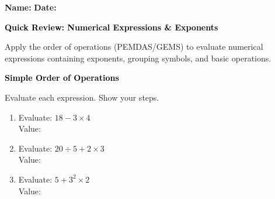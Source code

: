\documentclass[12pt, letterpaper, fleqn]{article}
\newcommand{\blanklong}{\underline{\hspace{6.5cm}}}
\begin{document}
\textbf{Name:} \underline{\hspace{5cm}}
\hfill
\textbf{Date:} \underline{\hspace{3cm}}\\

\begin{tcolorbox}[colback=black!10]
    \large\textcolor{black}{\textbf{Quick Review: Numerical Expressions \& Exponents}}
\end{tcolorbox}

\vspace{3mm}
\noindent
Apply the order of operations (PEMDAS/GEMS) to evaluate numerical expressions containing exponents, grouping symbols, and basic operations.

\vspace{4mm}

\begin{tcolorbox}[colback=black!10]
\large\textcolor{black}{\textbf{Simple Order of Operations}}
\end{tcolorbox}

\noindent
Evaluate each expression. Show your steps.

\vspace{3mm}

\begin{enumerate}[itemsep=2.2cm, leftmargin=0.6cm]

\item Evaluate: $18 - 3 \times 4$ \\
Value: \blanklong

\vspace{2cm}

\item Evaluate: $20 \div 5 + 2 \times 3$ \\
Value: \blanklong

\vspace{2cm}

\item Evaluate: $5 + 3^2 \times 2$ \\
Value: \blanklong

\vspace{2cm}

\end{enumerate}
\end{document}
